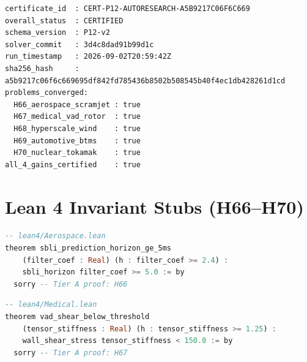 \documentclass[10pt,twocolumn]{article}
\begin{document}
\begin{certbox}
\small
\begin{verbatim}
certificate_id  : CERT-P12-AUTORESEARCH-A5B9217C06F6C669
overall_status  : CERTIFIED
schema_version  : P12-v2
solver_commit   : 3d4c8dad91b99d1c
run_timestamp   : 2026-09-02T20:59:42Z
sha256_hash     : a5b9217c06f6c669695df842fd785436b8502b508545b40f4ec1db428261d1cd
problems_converged:
  H66_aerospace_scramjet : true
  H67_medical_vad_rotor  : true
  H68_hyperscale_wind    : true
  H69_automotive_btms    : true
  H70_nuclear_tokamak    : true
all_4_gains_certified    : true
\end{verbatim}
\end{certbox}

\section{Lean 4 Invariant Stubs (H66--H70)}
\label{app:lean4}

\begin{lstlisting}[language=Haskell, caption={H66 SBLI invariant --- Lean 4 stub}]
-- lean4/Aerospace.lean
theorem sbli_prediction_horizon_ge_5ms
    (filter_coef : Real) (h : filter_coef >= 2.4) :
    sbli_horizon filter_coef >= 5.0 := by
  sorry -- Tier A proof: H66
\end{lstlisting}

\begin{lstlisting}[language=Haskell, caption={H67 VAD invariant --- Lean 4 stub}]
-- lean4/Medical.lean
theorem vad_shear_below_threshold
    (tensor_stiffness : Real) (h : tensor_stiffness >= 1.25) :
    wall_shear_stress tensor_stiffness < 150.0 := by
  sorry -- Tier A proof: H67
\end{lstlisting}
\end{document}
